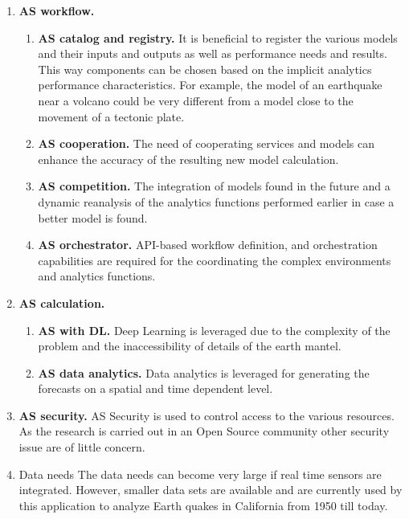 \begin{enumerate}
\begin{enumerate}
\end{enumerate}

\item{\bf AS workflow.}

  \begin{enumerate}
  
  \item{\bf AS catalog and registry.} It is beneficial to register the 
  various models and their inputs and outputs as well as performance needs and results. This way components can be chosen based on the implicit analytics performance characteristics. For example, the model of an earthquake near a volcano could be very different from a model close to the movement of a tectonic plate.

  \item{\bf AS cooperation.} The need of cooperating services and models can enhance the accuracy of the resulting new model calculation. 
  
  \item{\bf AS competition.} The integration of models found in the future and a dynamic reanalysis of the analytics functions performed earlier in case a better model is found.
 
  \item{\bf AS orchestrator.} API-based workflow definition, and orchestration capabilities are required for the coordinating the complex environments and analytics functions.
  
  \end{enumerate}


\item{\bf AS calculation.}

  \begin{enumerate}
  
  \item{\bf AS with DL.} Deep Learning is leveraged due to the complexity of the problem and the inaccessibility of details of the earth mantel.
  
  \item{\bf AS data analytics.} Data analytics is leveraged for generating the forecasts on a spatial and time dependent level.
  
  \end{enumerate}

\item{\bf AS security.} AS Security is used to control access to the various resources. As the research is carried out in an Open Source community other security issue are of little concern. 

\item{Data needs}  The data needs can become very large if real time sensors are integrated. However, smaller data sets are available and are currently used by this application to analyze Earth quakes in California from 1950 till today.
  

\end{enumerate}



